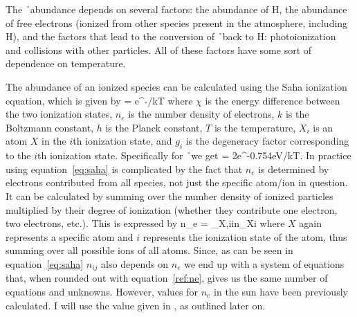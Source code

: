 The \h\ abundance depends on several factors: the abundance of H, the
abundance of free electrons (ionized from other species present in the
atmosphere, including H), and the factors that lead to the conversion
of \h\ back to H: photoionization and collisions with other particles.  All
of these factors have some sort of dependence on temperature.



The abundance of an ionized species can be calculated using the Saha
ionization equation, which is given by
\beq
\label{eq:saha}
 = e^{-\chi/kT}
\eeq
 where $\chi$ is the energy difference between the two ionization
states, $n_e$ is the number density of electrons, $k$ is the Boltzmann
constant, $h$ is the Planck constant, $T$ is the temperature, $X_i$ is
an atom $X$ in the $i$th ionization state, and $g_i$ is the degeneracy
factor corresponding to the $i$th ionization state.  Specifically
for \h\ we get
\beq
\label{eq:thisone}
 = 2e^{-0.754\textrm{eV}/kT}.
\eeq
In practice using equation~\ref{eq:saha} is complicated by the fact that
$n_e$ is determined by electrons contributed from all species, not
just the specific atom/ion in question.  It can be calculated by
summing over the number density
of ionized particles multiplied by their degree of ionization (whether
they contribute one electron, two electrons, etc.). This is expressed by
\beq
\label{ref:ne}
n_e = \sum\limits_{X,i}i\times n_{Xi}
\eeq
where $X$ again represents a specific atom and $i$ represents the ionization state
of the atom, thus summing over all possible ions of all atoms.  Since,
as can be seen in equation~\ref{eq:saha} $n_{ij}$ also depends on
$n_e$ we end up with a system of equations that, when rounded out with
equation~\ref{ref:ne}, gives us the same number of equations and
unknowns.  However, values for $n_e$ in the sun have been previously
calculated. I will use the value given in \cite{boehm1989}, as
outlined later on.  

